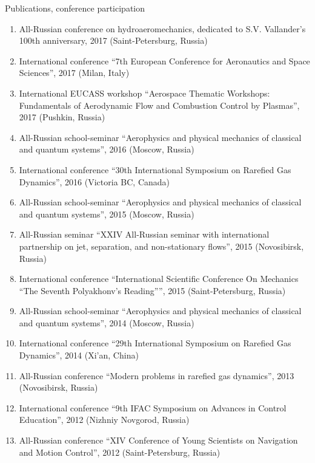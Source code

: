 \documentclass{resume} %
\begin{document}
\begin{rSection}{Publications, conference participation}
\begin{enumerate}
    \item All-Russian conference on hydroaeromechanics, dedicated to S.V. Vallander's 100th anniversary, 2017 (Saint-Petersburg, Russia)
    \item International conference ``7th European Conference for Aeronautics and Space Sciences'', 2017 (Milan, Italy)
    \item International EUCASS workshop ``Aerospace Thematic Workshops: Fundamentals of Aerodynamic Flow and Combustion Control by Plasmas'', 2017 (Pushkin, Russia)
    \item All-Russian school-seminar ``Aerophysics and physical mechanics of classical and quantum systems'', 2016 (Moscow, Russia)
    \item International conference ``30th International Symposium on Rarefied Gas Dynamics'', 2016 (Victoria BC, Canada)
    \item All-Russian school-seminar ``Aerophysics and physical mechanics of classical and quantum systems'', 2015 (Moscow, Russia)
    \item All-Russian seminar ``XXIV All-Russian seminar with international partnership on jet, separation, and non-stationary flows'', 2015 (Novosibirsk, Russia)
    \item International conference ``International Scientific Conference On Mechanics ``The Seventh Polyakhonv's Reading'''', 2015 (Saint-Petersburg, Russia)
    \item All-Russian school-seminar ``Aerophysics and physical mechanics of classical and quantum systems'', 2014 (Moscow, Russia)
    \item International conference ``29th International Symposium on Rarefied Gas Dynamics'', 2014 (Xi'an, China)
    \item All-Russian conference ``Modern problems in rarefied gas dynamics'', 2013 (Novosibirsk, Russia)
    \item International conference ``9th IFAC Symposium on Advances in Control Education'', 2012 (Nizhniy Novgorod, Russia)
    \item All-Russian conference ``XIV Conference of Young Scientists on Navigation and Motion Control'', 2012 (Saint-Petersburg, Russia)
\end{enumerate}

\end{rSection}


\end{document}
